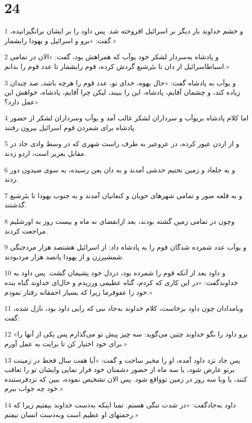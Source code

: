 \chapter{24}

\par 1 و خشم خداوند بار دیگر بر اسرائیل افروخته شد. پس داود را بر ایشان برانگیزانیده، گفت: «برو و اسرائیل و یهودا رابشمار.»
\par 2 و پادشاه به‌سردار لشکر خود یوآب که همراهش بود، گفت: «الان در تمامی اسباطاسرائیل از دان تا بئرشبع گردش کرده، قوم رابشمار تا عدد قوم را بدانم.»
\par 3 و یوآب به پادشاه گفت: «حال یهوه، خدای تو، عدد قوم را هر‌چه باشد، صد چندان زیاده کند، و چشمان آقایم، پادشاه، این را ببیند، لیکن چرا آقایم، پادشاه، خواهش این عمل دارد؟»
\par 4 اما کلام پادشاه بریوآب و سرداران لشکر غالب آمد و یوآب وسرداران لشکر از حضور پادشاه برای شمردن قوم اسرائیل بیرون رفتند.
\par 5 و از اردن عبور کرده، در عروعیر به طرف راست شهری که در وسط وادی جاد در مقابل یعزیر است، اردو زدند.
\par 6 و به جلعاد و زمین تحتیم حدشی آمدند و به دان یعن رسیده، به سوی صیدون دور زدند.
\par 7 و به قلعه صور و تمامی شهرهای حویان و کنعانیان آمدند و به جنوب یهودا تا بئرشبع گذشتند.
\par 8 وچون در تمامی زمین گشته بودند، بعد ازانقضای نه ماه و بیست روز به اورشلیم مراجعت کردند.
\par 9 و یوآب عدد شمرده شدگان قوم را به پادشاه داد: از اسرائیل هشتصد هزار مردجنگی شمشیرزن و از یهودا پانصد هزار مردبودند.
\par 10 و داود بعد از آنکه قوم را شمرده بود، دردل خود پشیمان گشت. پس داود به خداوندگفت: «در این کاری که کردم، گناه عظیمی ورزیدم و حال‌ای خداوند گناه بنده خود را عفوفرما زیرا که بسیار احمقانه رفتار نمودم.»
\par 11 وبامدادان چون داود برخاست، کلام خداوند به‌جاد نبی که رایی داود بود، نازل شده، گفت:
\par 12 «برو داود را بگو خداوند چنین می‌گوید: سه چیز پیش تو می‌گذارم پس یکی از آنها را برای خود اختیار کن تا برایت به عمل آورم.»
\par 13 پس جاد نزد داود آمده، او را مخبر ساخت و گفت: «آیا هفت سال قحط در زمینت برتو عارض شود، یا سه ماه از حضور دشمنان خود فرار نمایی وایشان تو را تعاقب کنند، یا وبا سه روز در زمین توواقع شود. پس الان تشخیص نموده، ببین که نزدفرستنده خود چه جواب ببرم.»
\par 14 داود به‌جادگفت: «در شدت تنگی هستم. تمنا اینکه به‌دست خداوند بیفتیم زیرا که رحمتهای او عظیم است وبه‌دست انسان نیفتم.» 

